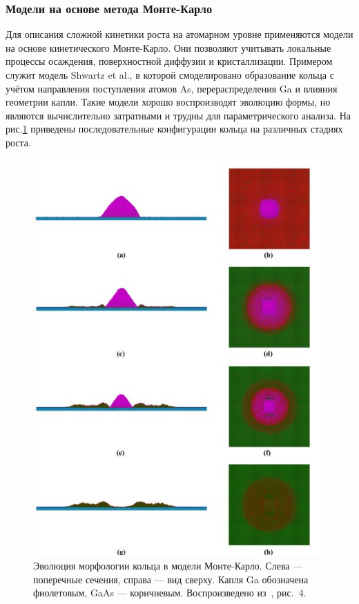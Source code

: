 \documentclass[14pt,oneside]{extarticle}
\begin{document}
\subsubsection*{Модели на основе метода Монте-Карло}
Для описания сложной кинетики роста на атомарном уровне применяются модели на основе кинетического Монте-Карло. Они позволяют учитывать локальные процессы осаждения, поверхностной диффузии и кристаллизации. Примером служит модель Shwartz et al.\cite{shwartz2018}, в которой смоделировано образование кольца с учётом направления поступления атомов As, перераспределения Ga и влияния геометрии капли. Такие модели хорошо воспроизводят эволюцию формы, но являются вычислительно затратными и трудны для параметрического анализа. На рис.\ref{fig:shwartz4} приведены последовательные конфигурации кольца на различных стадиях роста.

\begin{figure}
    \begin{center}
        \includegraphics[width=11cm]{images/shwartz_fig4.png}
        \caption{\label{fig:shwartz4}
            Эволюция морфологии кольца в модели Монте-Карло. Слева — поперечные сечения, справа — вид сверху. Капля Ga обозначена фиолетовым, GaAs — коричневым. Воспроизведено из~\cite{shwartz2018}, рис.~4.}
    \end{center}
\end{figure}
\end{document}

